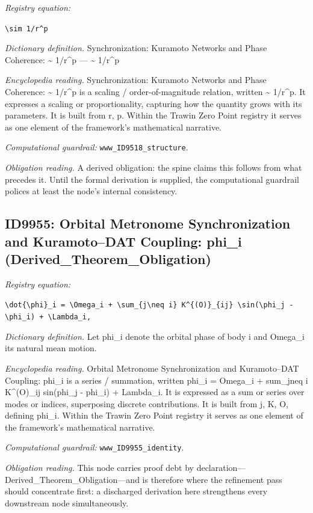 \documentclass[11pt]{article}
\theoremstyle{remark}
\begin{document}
\noindent\textit{Registry equation:}\par
{\small\texttt{\textbackslash{}sim 1/r\textasciicircum{}p}}\par\medskip
\noindent\textit{Dictionary definition.} Synchronization: Kuramoto Networks and Phase Coherence: \textasciitilde{} 1/r\textasciicircum{}p --- \textasciitilde{} 1/r\textasciicircum{}p\par\medskip
\noindent\textit{Encyclopedia reading.} Synchronization: Kuramoto Networks and Phase Coherence: \textasciitilde{} 1/r\textasciicircum{}p is a scaling / order-of-magnitude relation, written \textasciitilde{} 1/r\textasciicircum{}p. It expresses a scaling or proportionality, capturing how the quantity grows with its parameters. It is built from r, p. Within the Trawin Zero Point registry it serves as one element of the framework's mathematical narrative.
\par\medskip\noindent\textit{Computational guardrail:} \texttt{www\_ID9518\_structure}.
\par\medskip\noindent\textit{Obligation reading.} A derived obligation: the spine claims this follows from what precedes it. Until the formal derivation is supplied, the computational guardrail polices at least the node's internal consistency.

\subsection{ID9955: Orbital Metronome Synchronization and Kuramoto--DAT Coupling: phi\_i (Derived\_Theorem\_Obligation)}

\noindent\textit{Registry equation:}\par
{\small\texttt{\textbackslash{}dot\{\textbackslash{}phi\}\_i = \textbackslash{}Omega\_i + \textbackslash{}sum\_\{j\textbackslash{}neq i\} K\textasciicircum{}\{(O)\}\_\{ij\} \textbackslash{}sin(\textbackslash{}phi\_j - \textbackslash{}phi\_i) + \textbackslash{}Lambda\_i,}}\par\medskip
\noindent\textit{Dictionary definition.} Let phi\_i denote the orbital phase of body i and Omega\_i its natural mean motion.\par\medskip
\noindent\textit{Encyclopedia reading.} Orbital Metronome Synchronization and Kuramoto--DAT Coupling: phi\_i is a series / summation, written phi\_i = Omega\_i + sum\_jneq i K\textasciicircum{}(O)\_ij sin(phi\_j - phi\_i) + Lambda\_i. It is expressed as a sum or series over modes or indices, superposing discrete contributions. It is built from j, K, O, defining phi\_i. Within the Trawin Zero Point registry it serves as one element of the framework's mathematical narrative.
\par\medskip\noindent\textit{Computational guardrail:} \texttt{www\_ID9955\_identity}.
\par\medskip\noindent\textit{Obligation reading.} This node carries proof debt by declaration---Derived\_Theorem\_Obligation---and is therefore where the refinement pass should concentrate first: a discharged derivation here strengthens every downstream node simultaneously.
\end{document}
